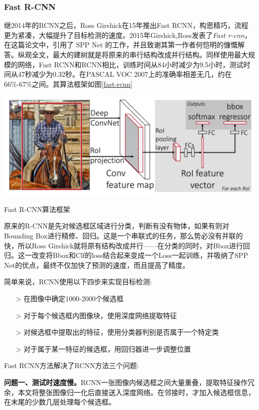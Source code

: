 \subsubsection{Fast R-CNN}
继2014年的RCNN之后，Ross Girshick在15年推出Fast RCNN，构思精巧，流程更为紧凑，大幅提升了目标检测的速度。2015年Girshick,Ross发表了\textit{Fast r-cnn}\cite{fastrcnn}，在这篇论文中，引用了 SPP Net 的工作，并且致谢其第一作者何恺明的慷慨解答。纵观全文，最大的建树就是将原来的串行结构改成并行结构。同样使用最大规模的网络，Fast RCNN和RCNN相比，训练时间从84小时减少为9.5小时，测试时间从47秒减少为0.32秒。在PASCAL VOC 2007上的准确率相差无几，约在66\%-67\%之间。其算法框架如图\ref{fast-rcnn}
\begin{uscfigure}
	\includegraphics[width=\textwidth]{./Pictures/fast_rcnn.png}	
	\caption{Fast R-CNN算法框架}	
	\label{fast-rcnn}
\end{uscfigure}
原来的R-CNN是先对候选框区域进行分类，判断有没有物体，如果有则对Bounding Box进行精修、回归。这是一个串联式的任务，那么势必没有并联的快，所以Ross Girshick就将原有结构改成并行——在分类的同时，对Bbox进行回归。这一改变将Bbox和Clf的loss结合起来变成一个Loss一起训练，并吸纳了SPP Net的优点，最终不仅加快了预测的速度，而且提高了精度。

简单来说，RCNN使用以下四步来实现目标检测:
\begin{itemize}
	\item[>] 在图像中确定1000-2000个候选框 
	\item[>] 对于每个候选框内图像块，使用深度网络提取特征
	\item[>] 对候选框中提取出的特征，使用分类器判别是否属于一个特定类
	\item[>] 对于属于某一特征的候选框，用回归器进一步调整位置
\end{itemize}
Fast RCNN方法解决了RCNN方法三个问题:

\textbf{问题一、测试时速度慢。}RCNN一张图像内候选框之间大量重叠，提取特征操作冗余，本文将整张图像归一化后直接送入深度网络。在邻接时，才加入候选框信息，在末尾的少数几层处理每个候选框。

